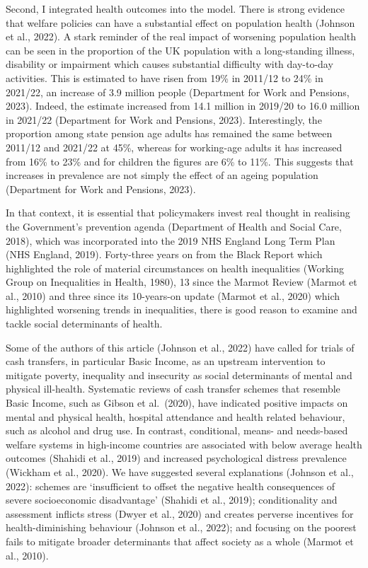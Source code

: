 \documentclass[
  letterpaper,
  DIV=11,
  numbers=noendperiod]{scrartcl}
\begin{document}
Second, I integrated health outcomes into the model. There is strong
evidence that welfare policies can have a substantial effect on
population health (Johnson et al., 2022). A stark reminder of the real
impact of worsening population health can be seen in the proportion of
the UK population with a long-standing illness, disability or impairment
which causes substantial difficulty with day-to-day activities. This is
estimated to have risen from 19\% in 2011/12 to 24\% in 2021/22, an
increase of 3.9 million people (Department for Work and Pensions, 2023).
Indeed, the estimate increased from 14.1 million in 2019/20 to 16.0
million in 2021/22 (Department for Work and Pensions, 2023).
Interestingly, the proportion among state pension age adults has
remained the same between 2011/12 and 2021/22 at 45\%, whereas for
working-age adults it has increased from 16\% to 23\% and for children
the figures are 6\% to 11\%. This suggests that increases in prevalence
are not simply the effect of an ageing population (Department for Work
and Pensions, 2023).

In that context, it is essential that policymakers invest real thought
in realising the Government's prevention agenda (Department of Health
and Social Care, 2018), which was incorporated into the 2019 NHS England
Long Term Plan (NHS England, 2019). Forty-three years on from the Black
Report which highlighted the role of material circumstances on health
inequalities (Working Group on Inequalities in Health, 1980), 13 since
the Marmot Review (Marmot et al., 2010) and three since its 10-years-on
update (Marmot et al., 2020) which highlighted worsening trends in
inequalities, there is good reason to examine and tackle social
determinants of health.

Some of the authors of this article (Johnson et al., 2022) have called
for trials of cash transfers, in particular Basic Income, as an upstream
intervention to mitigate poverty, inequality and insecurity as social
determinants of mental and physical ill-health. Systematic reviews of
cash transfer schemes that resemble Basic Income, such as Gibson et
al.~(2020), have indicated positive impacts on mental and physical
health, hospital attendance and health related behaviour, such as
alcohol and drug use. In contrast, conditional, means- and needs-based
welfare systems in high-income countries are associated with below
average health outcomes (Shahidi et al., 2019) and increased
psychological distress prevalence (Wickham et al., 2020). We have
suggested several explanations (Johnson et al., 2022): schemes are
`insufficient to offset the negative health consequences of severe
socioeconomic disadvantage' (Shahidi et al., 2019); conditionality and
assessment inflicts stress (Dwyer et al., 2020) and creates perverse
incentives for health-diminishing behaviour (Johnson et al., 2022); and
focusing on the poorest fails to mitigate broader determinants that
affect society as a whole (Marmot et al., 2010).
\end{document}
